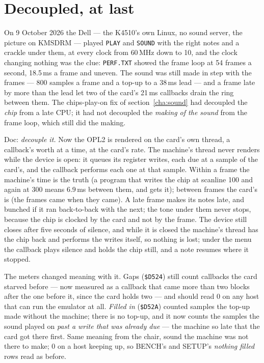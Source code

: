 \section{Decoupled, at last}
On 9 October 2026 the Dell --- the K4510's own Linux, no sound server,
the picture on KMSDRM --- played \texttt{PLAY} and \texttt{SOUND} with the
right notes and a crackle under them, at every clock from 60\,MHz down
to 10, and the clock changing nothing was the clue: \texttt{PERF.TXT}
showed the frame loop at 54 frames a second, 18.5\,ms a frame and
uneven. The sound was still made in step with the frames --- 800 samples
a frame and a top-up to a 38\,ms lead --- and a frame late by more than
the lead let two of the card's 21\,ms callbacks drain the ring between
them. The chips-play-on fix of section~\ref{cha:sound} had decoupled
the \emph{chip} from a late CPU; it had not decoupled the \emph{making
of the sound} from the frame loop, which still did the making.

Doc: \emph{decouple it.} Now the OPL2 is rendered on the card's own
thread, a callback's worth at a time, at the card's rate. The machine's
thread never renders while the device is open: it queues its register
writes, each due at a sample of the card's, and the callback performs
each one at that sample. Within a frame the machine's time is the
truth (a program that writes the chip at scanline 100 and again at 300
means 6.9\,ms between them, and gets it); between frames the card's is
(the frames came when they came). A late frame makes its notes late,
and bunched if it ran back-to-back with the next; the tone under them
never stops, because the chip is clocked by the card and not by the
frame. The device still closes after five seconds of silence, and while
it is closed the machine's thread has the chip back and performs the
writes itself, so nothing is lost; under the menu the callback plays
silence and holds the chip still, and a note resumes where it stopped.

The meters changed meaning with it. Gaps (\texttt{\$D524}) still count
callbacks the card starved before --- now measured as a callback that
came more than two blocks after the one before it, since the card holds
two --- and should read 0 on any host that can run the emulator at all.
\emph{Filled in} (\texttt{\$D52A}) counted samples the top-up made
without the machine; there is no top-up, and it now counts the samples
the sound played on \emph{past a write that was already due} --- the
machine so late that the card got there first. Same meaning from the
chair, sound the machine was not there to make; 0 on a host keeping
up, so BENCH's and SETUP's \emph{nothing filled} rows read as before.
